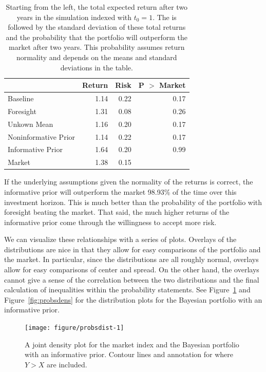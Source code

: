 \documentclass[a4paper]{article}\usepackage[]{graphicx}\usepackage[]{color}
\newenvironment{knitrout}{}{} %
\begin{document}
\begin{table}[ht]
\centering
\begin{tabular}{lrrr}
  \hline
 & Return & Risk & P $>$ Market  \\ 
  \hline
Baseline & 1.14 & 0.22 & 0.17 \\ 
  Foresight & 1.31 & 0.08 & 0.26 \\ 
  Unkown Mean & 1.16 & 0.20 & 0.17 \\ 
  Noninformative Prior & 1.14 & 0.22 & 0.17 \\ 
  Informative Prior & 1.64 & 0.20 & 0.99 \\ 
  Market & 1.38 & 0.15 &  \\ 
   \hline
\end{tabular}
\caption{Starting from the left, the total expected return after two years in the simulation indexed with $t_0 = 1$. The is followed by the standard deviation of these total returns and the probability that the portfolio will outperform the market after two years. This probability assumes return normality and depends on the means and standard deviations in the table.} 
\label{tab:simulations}
\end{table}


If the underlying assumptions given the normality of the returns is correct, the informative prior will outperform the market 98.93\% of the time over this investment horizon. This is much better than the probability of the portfolio with foresight beating the market. That said, the much higher returns of the informative prior come through the willingness to accept more risk.

We can visualize these relationships with a series of plots. Overlays of the distributions are nice in that they allow for easy comparisons of the portfolio and the market. In particular, since the distributions are all roughly normal, overlays allow for easy comparisons of center and spread. On the other hand, the overlays cannot give a sense of the correlation between the two distributions and the final calculation of inequalities within the probability statements. See Figure~\ref{fig:probsdist} and Figure~\ref{fig:probsdens} for the distribution plots for the Bayesian portfolio with an informative prior.

\begin{knitrout}
\color{fgcolor}\begin{figure}
\texttt{[image: figure/probsdist-1]} \caption[A joint density plot for the market index and the Bayesian portfolio with an informative prior]{A joint density plot for the market index and the Bayesian portfolio with an informative prior. Contour lines and annotation for where $Y > X$ are included.\label{fig:probsdist}}
\end{figure}


\end{knitrout}
\end{document}
